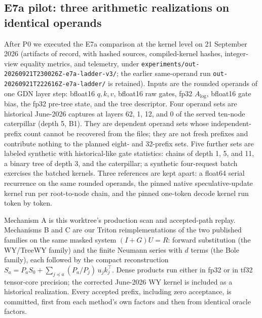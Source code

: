 \documentclass[conference]{IEEEtran}
\begin{document}
\subsection{E7a pilot: three arithmetic realizations on identical operands}
\label{sec:e7a-pilot}
After P0 we executed the E7a comparison at the kernel level on 21 September 2026 (artifacts of record, with hashed sources, compiled-kernel hashes, integer-view equality metrics, and telemetry, under \texttt{experiments/out-20260921T230026Z-e7a-ladder-v3/}; the earlier same-operand run \texttt{out-20260921T222616Z-e7a-ladder/} is retained). Inputs are the rounded operands of one GDN layer step: bfloat16 $q,k,v$, bfloat16 raw gates, fp32 $A_{\log}$, bfloat16 gate bias, the fp32 pre-tree state, and the tree descriptor. Four operand sets are historical June-2026 captures at layers 62, 1, 12, and 0 of the served ten-node caterpillar (depth 5, B1). They are dependent operand sets whose independent-prefix count cannot be recovered from the files; they are not fresh prefixes and contribute nothing to the planned eight- and 32-prefix sets. Five further sets are labeled synthetic with historical-like gate statistics: chains of depth 1, 5, and 11, a binary tree of depth 3, and the caterpillar; a synthetic four-request batch exercises the batched kernels. Three references are kept apart: a float64 serial recurrence on the same rounded operands, the pinned native speculative-update kernel run per root-to-node chain, and the pinned one-token decode kernel run token by token.

Mechanism A is this worktree's production scan and accepted-path replay. Mechanisms B and C are our Triton reimplementations of the two published families on the same masked system $(I+G)U=R$: forward substitution (the WY/TreeWY family) and the finite Neumann series with $d$ terms (the Bole family), each followed by the compact reconstruction $S_a=P_aS_0+\sum_{j\preceq a}(P_a/P_j)\,u_jk_j^\top$. Dense products run either in fp32 or in tf32 tensor-core precision; the corrected June-2026 WY kernel is included as a historical realization. Every accepted prefix, including zero acceptance, is committed, first from each method's own factors and then from identical oracle factors.
\end{document}
